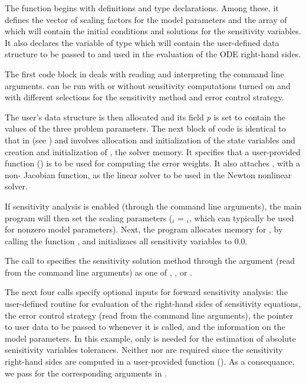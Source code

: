 The  function begins with definitions and type declarations. 
Among these, it defines the vector  of  scaling factors for
the model parameters   and the array  of 
 which will contain the initial conditions and solutions for the sensitivity
variables. It also declares the variable  of type  
which will contain the user-defined data structure to be passed to {\cvodes} and used in the 
evaluation of the ODE right-hand sides.

The first code block in  deals with reading and interpreting the
command line arguments.  can be run with or without sensitivity computations
turned on and with different selections for the sensitivity method and error control strategy.

The user's data structure is then allocated and its field {\em p} is set to contain
the values of the three problem parameters.
The next block of code is identical to that in  (see \cite{cvode_ex})
and involves allocation and initialization of the state variables and creation and 
initialization of , the {\cvodes} solver memory. It specifies that
a user-provided function () is to be used for computing the error weights.
It also attaches {\cvdense}, with a non- Jacobian function, as the linear solver 
to be used in the Newton nonlinear solver.

If sensitivity analysis is enabled (through the command line arguments), 
the main program will then set the scaling parameters
 ($_i$ = $_i$, which can typically be used for 
nonzero model parameters). 
Next, the program allocates memory for , by calling the {\nvecs} function 
, and initializaes all sensitivity variables to $0.0$.

The call to  specifies the sensitivity solution
method through the argument  (read from the command
line arguments) as one of , , or
.

The next four calls specify optional inputs for forward sensitivity analysis:
the user-defined routine for evaluation of the right-hand
sides of sensitivity equations, the error control strategy
(read from the command line arguments), the pointer to
user data to be passed to  whenever it is called, and  
the information on the model parameters. In this example, only  is needed for the 
estimation of absolute senisitivity variables tolerances. Neither  nor 
are required since the sensitivity right-hand sides are computed in a user-provided
function (). As a consequance, we pass  for the corresponding arguments in
.

